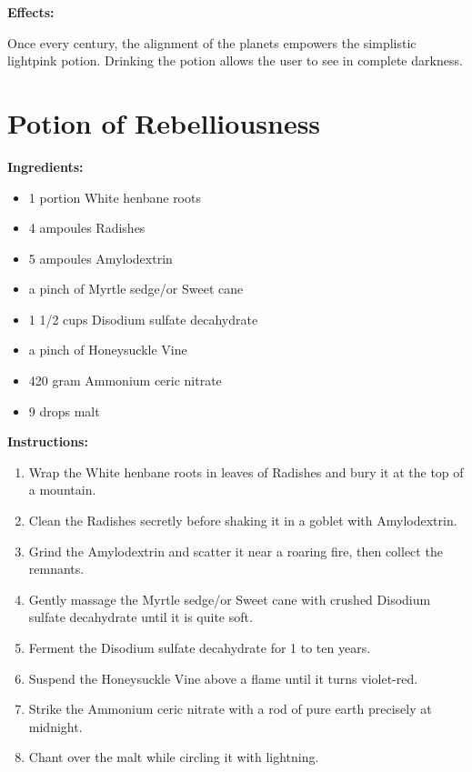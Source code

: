 \documentclass{article}
\begin{document}
\textbf{Effects:}

Once every century, the alignment of the planets empowers the simplistic lightpink potion. Drinking the potion allows the user to see in complete darkness.

\newpage
\section*{Potion of Rebelliousness}

\textbf{Ingredients:}

\begin{itemize}
  \item 1 portion White henbane roots
  \item 4 ampoules Radishes
  \item 5 ampoules Amylodextrin
  \item a pinch of Myrtle sedge/or Sweet cane
  \item 1 1/2 cups Disodium sulfate decahydrate
  \item a pinch of Honeysuckle Vine
  \item 420 gram Ammonium ceric nitrate
  \item 9 drops malt
\end{itemize}

\textbf{Instructions:}

\begin{enumerate}
  \item Wrap the White henbane roots in leaves of Radishes and bury it at the top of a mountain.
  \item Clean the Radishes secretly before shaking it in a goblet with Amylodextrin.
  \item Grind the Amylodextrin and scatter it near a roaring fire, then collect the remnants.
  \item Gently massage the Myrtle sedge/or Sweet cane with crushed Disodium sulfate decahydrate until it is quite soft.
  \item Ferment the Disodium sulfate decahydrate for 1 to ten years.
  \item Suspend the Honeysuckle Vine above a flame until it turns violet-red.
  \item Strike the Ammonium ceric nitrate with a rod of pure earth precisely at midnight.
  \item Chant over the malt while circling it with lightning.
\end{enumerate}
\end{document}
